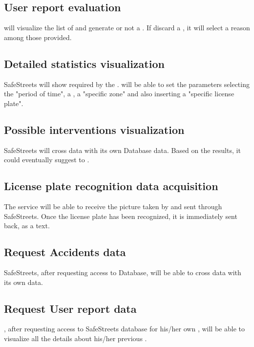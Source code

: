 \documentclass[../../rasd.tex]{subfiles}
\begin{document}
	\subsection{User report evaluation}
	 will visualize the list of  and generate or not a . If  discard a , it will select a reason among those provided.
	
	\subsection{Detailed statistics visualization}
	SafeStreets will show  required by the .  will be able to set the parameters selecting the "period of time", a , a "specific zone" and also inserting a "specific license plate". 
	
	\subsection{Possible interventions visualization}
	SafeStreets will cross   data with its own Database data. Based on the results, it could eventually suggest  to . 
	
	\subsection{License plate recognition data acquisition}
	The service will be able to receive the picture taken by  and sent through SafeStreets. Once the license plate has been recognized, it is immediately sent back, as a text.
	
	\subsection{Request Accidents data}
	SafeStreets, after requesting access to   Database, will be able to cross  data with its own data. 
	
	\subsection{Request User report data}
	, after requesting access to SafeStreets database for his/her own , will be able to visualize all the details about his/her previous . 
	
\end{document}

